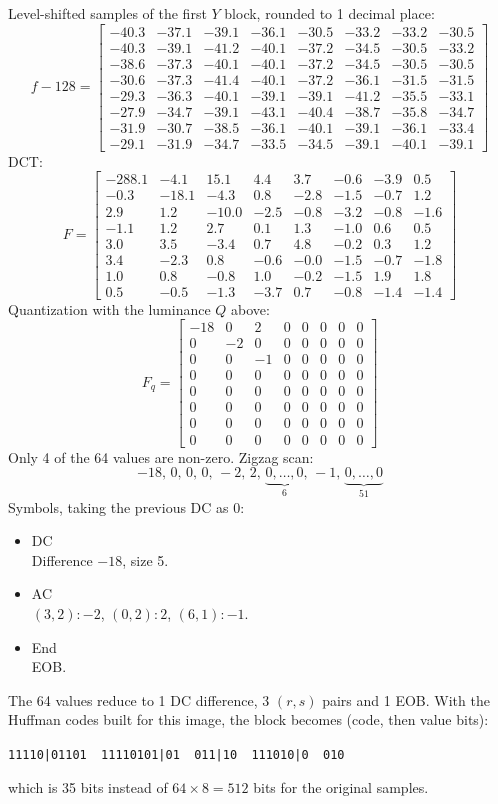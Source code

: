 \documentclass[11pt,a4paper]{article}
\begin{document}
Level-shifted samples of the first $Y$ block, rounded to 1 decimal place:
\[
f-128=\begin{bmatrix}
-40.3&-37.1&-39.1&-36.1&-30.5&-33.2&-33.2&-30.5 \\
-40.3&-39.1&-41.2&-40.1&-37.2&-34.5&-30.5&-33.2 \\
-38.6&-37.3&-40.1&-40.1&-37.2&-34.5&-30.5&-30.5 \\
-30.6&-37.3&-41.4&-40.1&-37.2&-36.1&-31.5&-31.5 \\
-29.3&-36.3&-40.1&-39.1&-39.1&-41.2&-35.5&-33.1 \\
-27.9&-34.7&-39.1&-43.1&-40.4&-38.7&-35.8&-34.7 \\
-31.9&-30.7&-38.5&-36.1&-40.1&-39.1&-36.1&-33.4 \\
-29.1&-31.9&-34.7&-33.5&-34.5&-39.1&-40.1&-39.1
\end{bmatrix}
\]
DCT:
\[
F=\begin{bmatrix}
-288.1&-4.1&15.1&4.4&3.7&-0.6&-3.9&0.5 \\
-0.3&-18.1&-4.3&0.8&-2.8&-1.5&-0.7&1.2 \\
2.9&1.2&-10.0&-2.5&-0.8&-3.2&-0.8&-1.6 \\
-1.1&1.2&2.7&0.1&1.3&-1.0&0.6&0.5 \\
3.0&3.5&-3.4&0.7&4.8&-0.2&0.3&1.2 \\
3.4&-2.3&0.8&-0.6&-0.0&-1.5&-0.7&-1.8 \\
1.0&0.8&-0.8&1.0&-0.2&-1.5&1.9&1.8 \\
0.5&-0.5&-1.3&-3.7&0.7&-0.8&-1.4&-1.4
\end{bmatrix}
\]
Quantization with the luminance $Q$ above:
\[
F_q=\begin{bmatrix}
-18&0&2&0&0&0&0&0 \\
0&-2&0&0&0&0&0&0 \\
0&0&-1&0&0&0&0&0 \\
0&0&0&0&0&0&0&0 \\
0&0&0&0&0&0&0&0 \\
0&0&0&0&0&0&0&0 \\
0&0&0&0&0&0&0&0 \\
0&0&0&0&0&0&0&0
\end{bmatrix}
\]
Only 4 of the 64 values are non-zero. Zigzag scan:
\[
-18,\,0,\,0,\,0,\,-2,\,2,\,\underbrace{0,\dots,0}_{6},\,-1,\,\underbrace{0,\dots,0}_{51}
\]
Symbols, taking the previous DC as 0:
\begin{itemize}
\item DC\\
  Difference $-18$, size 5.
\item AC\\
  $(3,2){:}-2$, $(0,2){:}2$, $(6,1){:}-1$.
\item End\\
  EOB.
\end{itemize}
The 64 values reduce to 1 DC difference, 3 $(r,s)$ pairs and 1 EOB. With the Huffman codes built for this image, the block becomes (code, then value bits):
\begin{center}
\texttt{11110|01101\ \ 11110101|01\ \ 011|10\ \ 111010|0\ \ 010}
\end{center}
which is 35 bits instead of $64\times8=512$ bits for the original samples.
\end{document}
